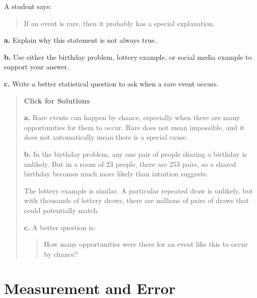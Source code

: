 \documentclass[
  letterpaper,
  DIV=11,
  numbers=noendperiod]{scrreprt}
\begin{document}
\begin{tcolorbox}[enhanced jigsaw, arc=.35mm, bottomrule=.15mm, bottomtitle=1mm, breakable, colback=white, colbacktitle=quarto-callout-note-color!10!white, colframe=quarto-callout-note-color-frame, coltitle=black, left=2mm, leftrule=.75mm, opacityback=0, opacitybacktitle=0.6, rightrule=.15mm, title=\textcolor{quarto-callout-note-color}{\faInfo}\hspace{0.5em}{Question 15}, titlerule=0mm, toprule=.15mm, toptitle=1mm]

A student says:

\begin{quote}
If an event is rare, then it probably has a special explanation.
\end{quote}

\textbf{a.} Explain why this statement is not always true.

\textbf{b.} Use either the birthday problem, lottery example, or social
media example to support your answer.

\textbf{c.} Write a better statistical question to ask when a rare event
occurs.

\begin{quote}
\textbf{Click for Solutions}

\textbf{a.} Rare events can happen by chance, especially when there are
many opportunities for them to occur. Rare does not mean impossible, and
it does not automatically mean there is a special cause.

\textbf{b.} In the birthday problem, any one pair of people sharing a
birthday is unlikely. But in a room of 23 people, there are 253 pairs,
so a shared birthday becomes much more likely than intuition suggests.

The lottery example is similar. A particular repeated draw is unlikely,
but with thousands of lottery draws, there are millions of pairs of
draws that could potentially match.

\textbf{c.} A better question is:

\begin{quote}
How many opportunities were there for an event like this to occur by
chance?
\end{quote}
\end{quote}

\end{tcolorbox}


\chapter{Measurement and Error}\label{measurement-and-error}
\end{document}
